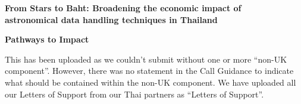 \documentclass[11pt]{article}
\begin{document}
    \setcounter{figure}{0}
    \noindent
    {\LARGE \bf From Stars to Baht: Broadening the economic impact of \\
    astronomical data handling techniques in Thailand}
    
    \vspace{3mm}
    \noindent
    {\LARGE \bf Pathways to Impact}
    
    \vspace{3mm}
    \noindent
    This has been uploaded as we couldn't submit without one or more ``non-UK component''. However, there was no statement in the Call Guidance to indicate what should be contained within the non-UK component. We have uploaded all our Letters of Support from our Thai partners as ``Letters of Support''.
\end{document}

